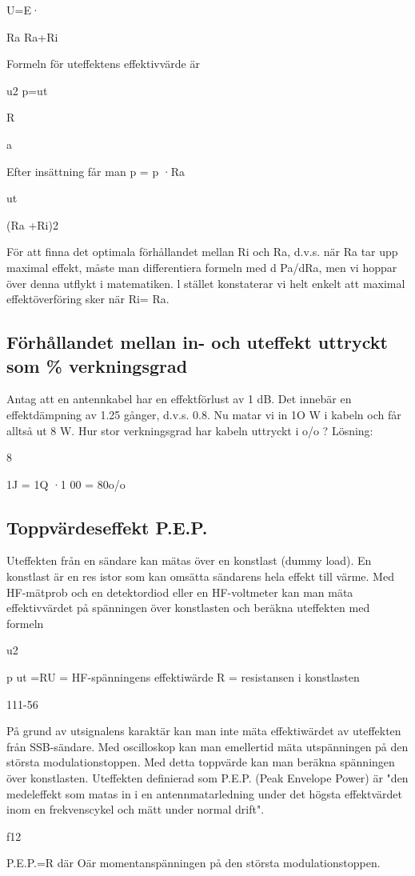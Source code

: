 U=E·

Ra
Ra+Ri

Formeln för uteffektens effektivvärde är

u2
p=ut

R

a

Efter insättning får man
p = p ·Ra

ut

(Ra +Ri)2

För att finna det optimala förhållandet
mellan Ri och Ra, d.v.s. när Ra tar upp maximal effekt, måste man differentiera formeln
med d Pa/dRa, men vi hoppar över denna
utflykt i matematiken.
l stället konstaterar vi helt enkelt att
maximal effektöverföring sker när Ri= Ra.

\subsection{Förhållandet mellan in- och uteffekt uttryckt som \% verkningsgrad}

Antag att en antennkabel har en effektförlust
av 1 dB. Det innebär en effektdämpning av
1.25 gånger, d.v.s. 0.8. Nu matar vi in 1O W
i kabeln och får alltså ut 8 W. Hur stor
verkningsgrad har kabeln uttryckt i o/o ?
Lösning:

8

1J = 1Q ·1 00 = 80o/o

\subsection{Toppvärdeseffekt P.E.P.}

Uteffekten från en sändare kan mätas över
en konstlast (dummy load). En konstlast är
en res istor som kan omsätta sändarens hela
effekt till värme. Med HF-mätprob och en
detektordiod eller en HF-voltmeter kan man
mäta effektivvärdet på spänningen över
konstlasten och beräkna uteffekten med
formeln

u2

p
ut =RU = HF-spänningens effektiwärde
R = resistansen i konstlasten

111-56

På grund av utsignalens karaktär kan
man inte mäta effektiwärdet av uteffekten
från SSB-sändare.
Med oscilloskop kan man emellertid mäta
utspänningen på den största modulationstoppen.
Med detta toppvärde kan man beräkna
spänningen över konstlasten.
Uteffekten definierad som P.E.P. (Peak
Envelope Power) är "den medeleffekt som
matas in i en antennmatarledning under det
högsta effektvärdet inom en frekvenscykel
och mätt under normal drift".

f12

P.E.P.=R
där Oär momentanspänningen på den största
modulationstoppen.


